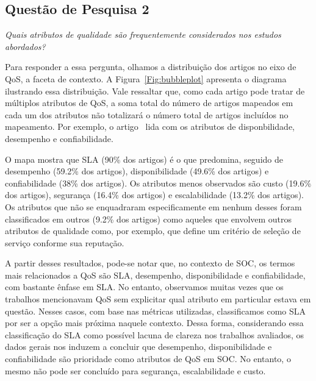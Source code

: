 \subsection{Quest\~{a}o de Pesquisa 2}
\emph{Quais atributos de qualidade são frequentemente considerados nos estudos abordados?}

Para responder a essa pergunta, olhamos a distribui\c{c}\~{a}o dos artigos no eixo de QoS, a faceta de contexto. A Figura~\ref{Fig:bubbleplot} apresenta o diagrama ilustrando essa distribui\c{c}\~{a}o. Vale ressaltar que, como cada artigo pode tratar de m\'{u}ltiplos atributos de QoS, a soma total do n\'{u}mero de artigos mapeados em cada um dos atributos n\~{a}o totalizar\'{a} o n\'{u}mero total de artigos inclu\'{i}dos no mapeamento. Por exemplo, o artigo~\cite{DBLP:journals/tse/CalinescuGKMT11} lida com os atributos de disponbilidade, desempenho e confiabilidade. 

O mapa mostra que SLA (90\% dos artigos) \'{e} o que predomina, seguido de desempenho (59.2\% dos artigos), disponibilidade (49.6\% dos artigos) e confiabilidade (38\% dos artigos). Os atributos menos observados s\~{a}o custo (19.6\% dos artigos), seguran\c{c}a (16.4\% dos artigos) e escalabilidade (13.2\% dos artigos). Os atributos que n\~{a}o se enquadraram especificamente em nenhum desses foram classificados em outros (9.2\% dos artigos) como aqueles que envolvem outros atributos de qualidade como, por exemplo, \cite{6036406} que define um crit\'{e}rio de sele\c{c}\~{a}o de servi\c{c}o conforme sua reputa\c{c}\~{a}o. 

A partir desses resultados, pode-se notar que, no contexto de SOC, os termos mais relacionados a QoS s\~{a}o SLA, desempenho, disponibilidade e confiabilidade, com bastante \^{e}nfase em SLA. No entanto, observamos muitas vezes que os trabalhos mencionavam QoS sem explicitar qual atributo em particular estava em quest\~{a}o. Nesses casos, com base nas m\'{e}tricas utilizadas, classificamos como SLA por ser a op\c{c}\~{a}o mais pr\'{o}xima naquele contexto. Dessa forma, considerando essa classifica\c{c}\~{a}o do SLA como poss\'{i}vel lacuna de clareza nos trabalhos avaliados, os dados gerais nos induzem a concluir que desempenho, disponibilidade e confiabilidade s\~{a}o prioridade como atributos de QoS em SOC. No entanto, o mesmo n\~{a}o pode ser conclu\'{i}do para seguran\c{c}a, escalabilidade e custo. 